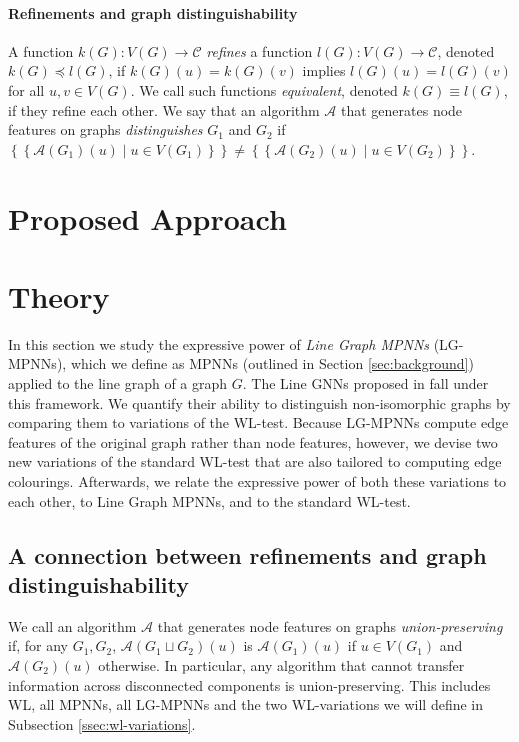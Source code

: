 \documentclass{article}
\newcommand{\multiset}[1]{\left\{\!\!\left\{#1\right\}\!\!\right\}}
\newcommand{\mca}{\mathcal{A}}
\newcommand{\mcc}{\mathcal{C}}
\begin{document}
\paragraph{Refinements and graph distinguishability}
A function $k(G): V(G) \rightarrow \mcc$ \emph{refines} a function $l(G): V(G) \rightarrow \mcc$, denoted $k(G) \preceq l(G)$, if $k(G)(u) = k(G)(v)$ implies $l(G)(u) = l(G)(v)$ for all $u,v\in V(G)$. We call such functions \emph{equivalent}, denoted $k(G) \equiv l(G)$, if they refine each other.
We say that an algorithm $\mca$ that generates node features on graphs \emph{distinguishes} $G_1$ and $G_2$ if $\multiset{\mca(G_1)(u) \mid u\in V(G_1)} \neq \multiset{\mca(G_2)(u) \mid u\in V(G_2)}$.





\section{Proposed Approach}




\section{Theory}


In this section we study the expressive power of \emph{Line Graph MPNNs} (LG-MPNNs), which we define as MPNNs (outlined in Section \ref{sec:background}) applied to the line graph of a graph $G$.
The Line GNNs proposed in \cite{cai2021line} fall under this framework.
We quantify their ability to distinguish non-isomorphic graphs by comparing them to variations of the WL-test.
Because LG-MPNNs compute edge features of the original graph rather than node features, however, we devise two new variations of the standard WL-test that are also tailored to computing edge colourings. 
Afterwards, we relate the expressive power of both these variations to each other, to Line Graph MPNNs, and to the standard WL-test.


\subsection{A connection between refinements and graph distinguishability}

We call an algorithm $\mca$ that generates node features on graphs \emph{union-preserving} if, for any $G_1,G_2$, $\mca(G_1 \sqcup G_2)(u)$ is $\mca(G_1)(u)$ if $u\in V(G_1)$ and $\mca(G_2)(u)$ otherwise.
In particular, any algorithm that cannot transfer information across disconnected components is union-preserving. This includes WL, all MPNNs, all LG-MPNNs and the two WL-variations we will define in Subsection \ref{ssec:wl-variations}.
\end{document}
